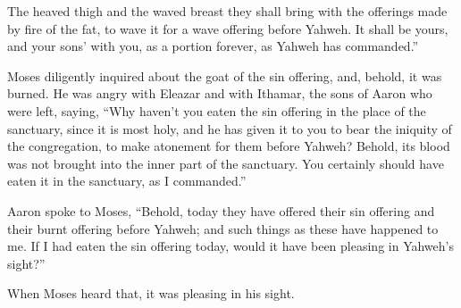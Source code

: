 {The heaved thigh and the waved breast they shall bring with the offerings made by fire of the fat, to wave it for a wave offering before Yahweh. It shall be yours, and your sons’ with you, as a portion forever, as Yahweh has commanded.”
\par }{\PP {}Moses diligently inquired about the goat of the sin offering, and, behold, it was burned. He was angry with Eleazar and with Ithamar, the sons of Aaron who were left, saying,
“Why haven’t you eaten the sin offering in the place of the sanctuary, since it is most holy, and he has given it to you to bear the iniquity of the congregation, to make atonement for them before Yahweh?
Behold, its blood was not brought into the inner part of the sanctuary. You certainly should have eaten it in the sanctuary, as I commanded.”
\par }{\PP {}Aaron spoke to Moses, “Behold, today they have offered their sin offering and their burnt offering before Yahweh; and such things as these have happened to me. If I had eaten the sin offering today, would it have been pleasing in Yahweh’s sight?”
\par }{\PP {}When Moses heard that, it was pleasing in his sight.

}
